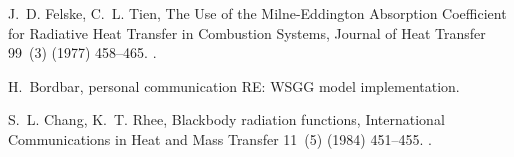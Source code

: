 \documentclass[preprint,12pt]{elsarticle}
\begin{document}
\begin{thebibliography}{10}
J.~D. Felske, C.~L. Tien, {The Use of the Milne-Eddington Absorption
  Coefficient for Radiative Heat Transfer in Combustion Systems}, {Journal of
  Heat Transfer} 99~(3) (1977) 458--465.
\newblock \href {http://dx.doi.org/10.1115/1.3450718}
  {}.

H.~Bordbar, {personal communication RE: WSGG model implementation}.

S.~L. Chang, K.~T. Rhee, {Blackbody radiation functions}, {International
  Communications in Heat and Mass Transfer} 11~(5) (1984) 451--455.
\newblock \href {http://dx.doi.org/10.1016/0735-1933(84)90051-4}
  {}.

\end{thebibliography}

\end{document}
